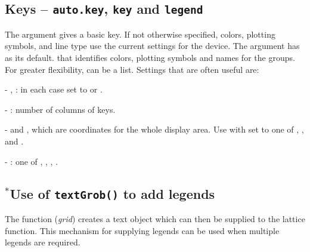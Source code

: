 \subsection{Keys -- \texttt{auto.key}, \texttt{key} and \texttt{legend}}\label{sec:keys}

The argument  gives a basic key. If not otherwise
specified, colors, plotting symbols, and line type use the current
settings for the device.  The argument  has
 as its default. that identifies
colors, plotting symbols and names for the groups. For greater
flexibility,  can be a list.  Settings that are often
useful are:
\begin{itemizz}
\item[-] , : in each case set to 
or .
\item[-] : number of columns of keys.
\item[-]  and , which are coordinates for
  the whole display area.  Use with  set
  to one of ,
  ,  and .
\item[-] : one of , ,
, .
\end{itemizz}

\subsection*{$^*$Use of \texttt{textGrob()} to add legends}
The function  (\textit{grid}) creates a text object
which can then be supplied to the lattice function. This
mechanism for supplying legends can be used when multiple legends are
required.

